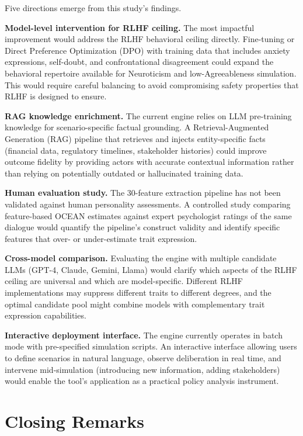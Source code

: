Five directions emerge from this study's findings.

\textbf{Model-level intervention for RLHF ceiling.} The most impactful improvement would address the RLHF behavioral ceiling directly. Fine-tuning or Direct Preference Optimization (DPO) with training data that includes anxiety expressions, self-doubt, and confrontational disagreement could expand the behavioral repertoire available for Neuroticism and low-Agreeableness simulation. This would require careful balancing to avoid compromising safety properties that RLHF is designed to ensure.

\textbf{RAG knowledge enrichment.} The current engine relies on LLM pre-training knowledge for scenario-specific factual grounding. A Retrieval-Augmented Generation (RAG) pipeline that retrieves and injects entity-specific facts (financial data, regulatory timelines, stakeholder histories) could improve outcome fidelity by providing actors with accurate contextual information rather than relying on potentially outdated or hallucinated training data.

\textbf{Human evaluation study.} The 30-feature extraction pipeline has not been validated against human personality assessments. A controlled study comparing feature-based OCEAN estimates against expert psychologist ratings of the same dialogue would quantify the pipeline's construct validity and identify specific features that over- or under-estimate trait expression.

\textbf{Cross-model comparison.} Evaluating the engine with multiple candidate LLMs (GPT-4, Claude, Gemini, Llama) would clarify which aspects of the RLHF ceiling are universal and which are model-specific. Different RLHF implementations may suppress different traits to different degrees, and the optimal candidate pool might combine models with complementary trait expression capabilities.

\textbf{Interactive deployment interface.} The engine currently operates in batch mode with pre-specified simulation scripts. An interactive interface allowing users to define scenarios in natural language, observe deliberation in real time, and intervene mid-simulation (introducing new information, adding stakeholders) would enable the tool's application as a practical policy analysis instrument.


\section{Closing Remarks}

